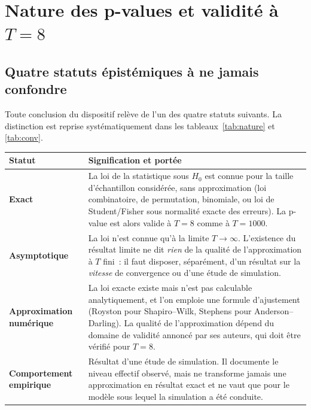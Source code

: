 \documentclass[a4paper,11pt]{article}
\begin{document}
\clearpage
\section{Nature des p-values et validité à $T = 8$}
\label{sec:nature}

\subsection{Quatre statuts épistémiques à ne jamais confondre}

Toute conclusion du dispositif relève de l'un des quatre statuts suivants. La
distinction est reprise systématiquement dans les tableaux~\ref{tab:nature} et
\ref{tab:conv}.

\begin{center}
\small
\begin{tabular}{@{}p{3.0cm}p{12.3cm}@{}}
\toprule
\textbf{Statut} & \textbf{Signification et portée} \\
\midrule
\textbf{Exact} & La loi de la statistique sous $H_0$ est connue pour la taille
d'échantillon considérée, sans approximation (loi combinatoire, de permutation,
binomiale, ou loi de Student/Fisher sous normalité exacte des erreurs). La
p-value est alors valide à $T = 8$ comme à $T = 1000$. \\
\textbf{Asymptotique} & La loi n'est connue qu'à la limite $T \to \infty$.
L'existence du résultat limite ne dit \emph{rien} de la qualité de
l'approximation à $T$ fini~: il faut disposer, séparément, d'un résultat sur la
\emph{vitesse} de convergence ou d'une étude de simulation. \\
\textbf{Approximation numérique} & La loi exacte existe mais n'est pas
calculable analytiquement, et l'on emploie une formule d'ajustement (Royston
pour Shapiro--Wilk, Stephens pour Anderson--Darling). La qualité de
l'approximation dépend du domaine de validité annoncé par ses auteurs, qui doit
être vérifié pour $T = 8$. \\
\textbf{Comportement empirique} & Résultat d'une étude de simulation. Il
documente le niveau effectif observé, mais ne transforme jamais une
approximation en résultat exact et ne vaut que pour le modèle sous lequel la
simulation a été conduite. \\
\bottomrule
\end{tabular}
\end{center}
\end{document}
